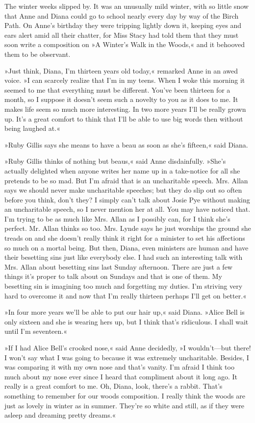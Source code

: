 The winter weeks slipped by. It was an unusually mild winter, with so little snow that Anne and Diana could go to school nearly every day by way of the Birch Path. On Anne’s birthday they were tripping lightly down it, keeping eyes and ears alert amid all their chatter, for Miss Stacy had told them that they must soon write a composition on »A Winter’s Walk in the Woods,« and it behooved them to be observant.

»Just think, Diana, I’m thirteen years old today,« remarked Anne in an awed voice. »I can scarcely realize that I’m in my teens. When I woke this morning it seemed to me that everything must be different. You’ve been thirteen for a month, so I suppose it doesn’t seem such a novelty to you as it does to me. It makes life seem so much more interesting. In two more years I’ll be really grown up. It’s a great comfort to think that I’ll be able to use big words then without being laughed at.«

»Ruby Gillis says she means to have a beau as soon as she’s fifteen,« said Diana.

»Ruby Gillis thinks of nothing but beaus,« said Anne disdainfully. »She’s actually delighted when anyone writes her name up in a take-notice for all she pretends to be so mad. But I’m afraid that is an uncharitable speech. Mrs. Allan says we should never make uncharitable speeches; but they do slip out so often before you think, don’t they? I simply can’t talk about Josie Pye without making an uncharitable speech, so I never mention her at all. You may have noticed that. I’m trying to be as much like Mrs. Allan as I possibly can, for I think she’s perfect. Mr. Allan thinks so too. Mrs. Lynde says he just worships the ground she treads on and she doesn’t really think it right for a minister to set his affections so much on a mortal being. But then, Diana, even ministers are human and have their besetting sins just like everybody else. I had such an interesting talk with Mrs. Allan about besetting sins last Sunday afternoon. There are just a few things it’s proper to talk about on Sundays and that is one of them. My besetting sin is imagining too much and forgetting my duties. I’m striving very hard to overcome it and now that I’m really thirteen perhaps I’ll get on better.«

»In four more years we’ll be able to put our hair up,« said Diana. »Alice Bell is only sixteen and she is wearing hers up, but I think that’s ridiculous. I shall wait until I’m seventeen.«

»If I had Alice Bell’s crooked nose,« said Anne decidedly, »I wouldn’t—but there! I won’t say what I was going to because it was extremely uncharitable. Besides, I was comparing it with my own nose and that’s vanity. I’m afraid I think too much about my nose ever since I heard that compliment about it long ago. It really is a great comfort to me. Oh, Diana, look, there’s a rabbit. That’s something to remember for our woods composition. I really think the woods are just as lovely in winter as in summer. They’re so white and still, as if they were asleep and dreaming pretty dreams.«

